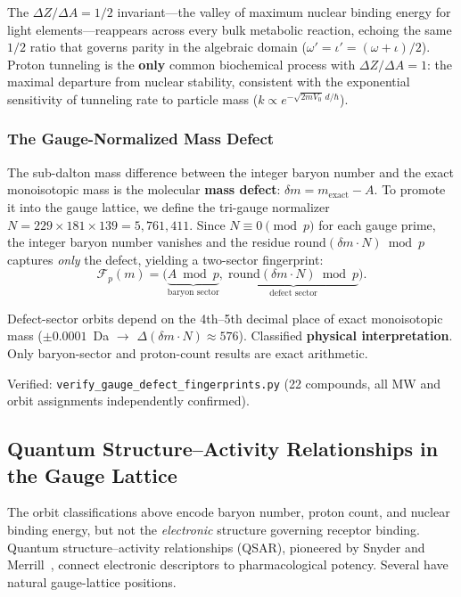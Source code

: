 The $\Delta Z/\Delta A = 1/2$ invariant---the valley of maximum nuclear binding energy for light elements---reappears across every bulk metabolic reaction, echoing the same $1/2$ ratio that governs parity in the algebraic domain ($\omega' = \iota' = (\omega+\iota)/2$). Proton tunneling is the \textbf{only} common biochemical process with $\Delta Z/\Delta A = 1$: the maximal departure from nuclear stability, consistent with the exponential sensitivity of tunneling rate to particle mass ($k \propto e^{-\sqrt{2mV_0}\,d/\hbar}$).

\subsubsection{The Gauge-Normalized Mass Defect}

The sub-dalton mass difference between the integer baryon number and the exact monoisotopic mass is the molecular \textbf{mass defect}: $\delta m = m_{\text{exact}} - A$. To promote it into the gauge lattice, we define the tri-gauge normalizer $N = 229 \times 181 \times 139 = 5{,}761{,}411$.
Since $N \equiv 0 \pmod{p}$ for each gauge prime, the integer baryon number vanishes and the residue $\mathrm{round}(\delta m \cdot N) \bmod p$ captures \emph{only} the defect, yielding a two-sector fingerprint:
\begin{equation}
  \mathcal{F}_p(m) = \bigl(\underbrace{A \bmod p}_{\text{baryon sector}},\;
  \underbrace{\mathrm{round}(\delta m \cdot N) \bmod p}_{\text{defect sector}}\bigr).
\end{equation}

\begin{remark}
\label{rem:defect_precision}
Defect-sector orbits depend on the 4th--5th decimal place of exact monoisotopic mass ($\pm 0.0001$~Da $\to$ $\Delta(\delta m \cdot N) \approx 576$). Classified \textbf{physical interpretation}. Only baryon-sector and proton-count results are exact arithmetic.
\end{remark}

Verified: \texttt{verify\_gauge\_defect\_fingerprints.py} (22 compounds, all MW and orbit assignments independently confirmed).

\subsection{Quantum Structure--Activity Relationships in the Gauge Lattice}

The orbit classifications above encode baryon number, proton count, and nuclear binding energy, but not the \emph{electronic} structure governing receptor binding. Quantum structure--activity relationships (QSAR), pioneered by Snyder and Merrill~\cite{snyder65}, connect electronic descriptors to pharmacological potency. Several have natural gauge-lattice positions.

